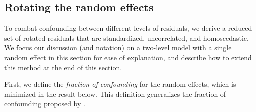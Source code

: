 \documentclass[12pt]{article} %
\newtheorem{definition}{Definition}
\newcommand{\trans}{\ensuremath{^\prime}}
\newcommand{\var}{\ensuremath{\mathrm{Var}}}
\begin{document}
\subsection{Rotating the random effects}\label{sec:rotate}

To combat  confounding between different  levels of residuals, we derive a reduced set of rotated residuals that are standardized, uncorrelated, and homoscedastic. We focus our discussion (and notation) on a two-level model with a single random effect in this section for ease of explanation, and describe how to extend this method at the end of this section.


First, we define the \emph{fraction of confounding} for the random effects, which is minimized in the result below. This definition generalizes the fraction of confounding proposed by \cite{HildenMinton:1995wh}. \\

%


\end{document}
